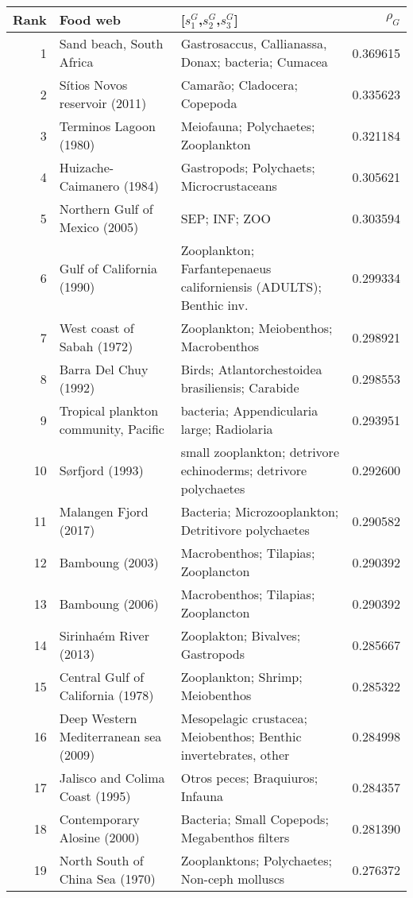 \begin{tabular}{rllr}
\toprule
Rank & Food web & [$s_1^G$,$s_2^G$,$s_3^G$] & $\rho_G$ \\
\midrule
1 & Sand beach, South Africa & Gastrosaccus, Callianassa, Donax; bacteria; Cumacea & 0.369615 \\
2 & Sítios Novos reservoir (2011) & Camarão; Cladocera; Copepoda & 0.335623 \\
3 & Terminos Lagoon (1980) & Meiofauna; Polychaetes; Zooplankton & 0.321184 \\
4 & Huizache-Caimanero (1984) & Gastropods; Polychaets; Microcrustaceans & 0.305621 \\
5 & Northern Gulf of Mexico (2005) & SEP; INF; ZOO & 0.303594 \\
6 & Gulf of California (1990) & Zooplankton; Farfantepenaeus californiensis (ADULTS); Benthic inv. & 0.299334 \\
7 & West coast of Sabah (1972) & Zooplankton; Meiobenthos; Macrobenthos & 0.298921 \\
8 & Barra Del Chuy (1992) & Birds; Atlantorchestoidea brasiliensis; Carabide & 0.298553 \\
9 & Tropical plankton community, Pacific & bacteria; Appendicularia large; Radiolaria & 0.293951 \\
10 & Sørfjord (1993) & small zooplankton; detrivore echinoderms; detrivore polychaetes & 0.292600 \\
11 & Malangen Fjord (2017) & Bacteria; Microzooplankton; Detritivore polychaetes & 0.290582 \\
12 & Bamboung (2003) & Macrobenthos; Tilapias; Zooplancton & 0.290392 \\
13 & Bamboung (2006) & Macrobenthos; Tilapias; Zooplancton & 0.290392 \\
14 & Sirinhaém River (2013) & Zooplakton; Bivalves; Gastropods & 0.285667 \\
15 & Central Gulf of California (1978) & Zooplankton; Shrimp; Meiobenthos & 0.285322 \\
16 & Deep Western Mediterranean sea (2009) & Mesopelagic crustacea; Meiobenthos; Benthic invertebrates, other & 0.284998 \\
17 & Jalisco and Colima Coast (1995) & Otros peces; Braquiuros; Infauna & 0.284357 \\
18 & Contemporary Alosine (2000) & Bacteria; Small Copepods; Megabenthos filters & 0.281390 \\
19 & North South of China Sea (1970) & Zooplanktons; Polychaetes; Non-ceph molluscs & 0.276372 \\

\end{tabular}
